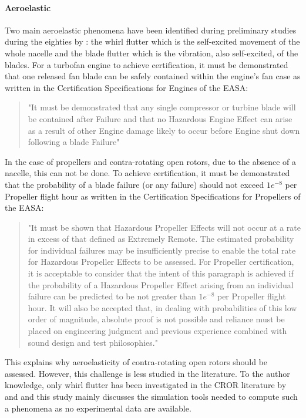 \paragraph{Aeroelastic}
Two main aeroelastic phenomena have been identified during preliminary studies
during the eighties by \citet{Hager1988}: the whirl flutter which is the self-excited
movement of the whole nacelle and the blade flutter which is the vibration, also
self-excited, of the blades.
For a turbofan engine to achieve certification, it must be demonstrated that one released fan blade can be safely contained within the engine’s fan case as written in the 
Certification Specifications for Engines of the EASA:
\begin{quote}
	"It must be demonstrated that any single compressor or turbine blade will be contained after Failure and 
that no Hazardous Engine Effect can arise as a result of other Engine damage likely to occur before 
Engine shut down following a blade Failure"
\end{quote}
In the case of propellers and contra-rotating open rotors, due to the absence of a nacelle,
this can not be done. To achieve certification, it must be demonstrated that the probability of a blade
failure (or any failure) should not exceed $1e^{-8}$ per Propeller flight hour as written in 
the Certification Specifications for Propellers of the EASA:
\begin{quote}
	"It must be shown that Hazardous Propeller Effects will not occur at a rate in excess of that defined 
as Extremely Remote. The estimated probability for individual failures may be insufficiently precise 
to enable the total rate for Hazardous Propeller Effects to be assessed. For Propeller certification, it 
is acceptable to consider that the intent of this paragraph is achieved if the probability of a 
Hazardous Propeller Effect arising from an individual failure can be predicted to be not greater than 
$1e^{-8}$ per Propeller flight hour. It will also be accepted that, in dealing with probabilities of this low 
order of magnitude, absolute proof is not possible and reliance must be placed on engineering 
judgment and previous experience combined with sound design and test philosophies." 
\end{quote}
This explains why aeroelasticity of contra-rotating open rotors should be assessed.
However, this challenge is less studied in the literature.
To the author knowledge, only whirl flutter has been investigated
in the CROR literature by \citet{CISicot2011a} and \citet{Verley2013} and this study mainly
discusses the simulation tools needed to compute such a phenomena as
no experimental data are available.
